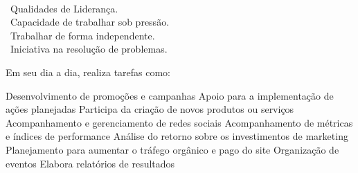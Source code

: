


\hfill \faUserFriends {}\\
\hfill \faBalanceScale {}\\
\hfill \faChess {}\\
\hfill \faUsersCog {}\\
\hfill \faCogs {}\\
\hfill \faDiagnoses {}\\
\hfill \faUsers {}

\begin{commentA} \vspace{0.3cm} \noindent
\vspace{8px}

\faMedal ~Qualidades de Liderança.\\ \vspace{3px}
\faItchIo ~Capacidade de trabalhar sob pressão. \\ \vspace{3px}
\faLaptopHouse ~Trabalhar de forma independente. \\ \vspace{3px}
\faChalkboardTeacher ~Iniciativa na resolução de problemas. \\ \vspace{3px}
 \par \vspace{0.1cm} \end{commentA}


\begin{commentA} \vspace{0.3cm} \noindent
Em seu dia a dia, realiza tarefas como:

Desenvolvimento de promoções e campanhas
Apoio para a implementação de ações planejadas
Participa da criação de novos produtos ou serviços
Acompanhamento e gerenciamento de redes sociais
Acompanhamento de métricas e índices de performance
Análise do retorno sobre os investimentos de marketing
Planejamento para aumentar o tráfego orgânico e pago do site
Organização de eventos
Elabora relatórios de resultados
 \par \vspace{0.1cm} \end{commentA}

